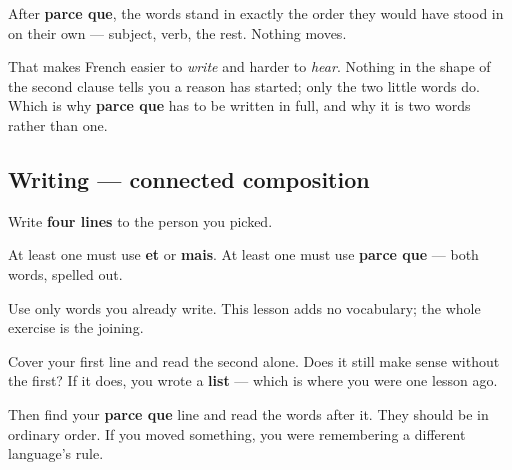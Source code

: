 After \textbf{parce que}, the words stand in exactly the order they would have stood in on their own — subject, verb, the rest. Nothing moves.

That makes French easier to \emph{write} and harder to \emph{hear}. Nothing in the shape of the second clause tells you a reason has started; only the two little words do. Which is why \textbf{parce que} has to be written in full, and why it is two words rather than one.

\subsection*{Writing — connected composition}
Write \textbf{four lines} to the person you picked.

At least one must use \textbf{et} or \textbf{mais}. At least one must use \textbf{parce que} — both words, spelled out.

Use only words you already write. This lesson adds no vocabulary; the whole exercise is the joining.

\begin{tcolorbox}[breakable,colback=teal!4,colframe=teal!35!black,title={Before you move on}]
Cover your first line and read the second alone. Does it still make sense without the first? If it does, you wrote a \textbf{list} — which is where you were one lesson ago.

Then find your \textbf{parce que} line and read the words after it. They should be in ordinary order. If you moved something, you were remembering a different language's rule.
\end{tcolorbox}
